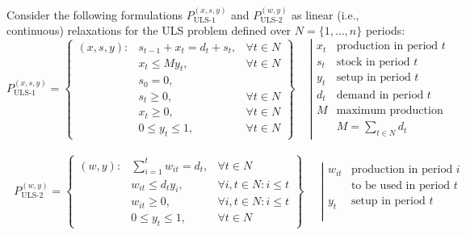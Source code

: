 Consider the following formulations $P_{\text{ULS-1}}^{(x,s,y)}$ and $P_{\text{ULS-2}}^{(w,y)}$ as linear (i.e., continuous) relaxations for the ULS problem defined over $N = \{1,\dots,n\}$ periods:
\renewcommand*{\arraystretch}{1.1}
\[P_{\text{ULS-1}}^{(x,s,y)} = \left\{
  \begin{array}{llr}
  	(x,s,y): & s_{t-1} + x_t = d_t + s_t, & \forall t\in N\\
    	     & x_t  \leq M y_t, 		  & \forall t\in N\\
    	     & s_0 = 0, 			      & 			  \\
    	     & s_t \geq 0, 				  & \forall t\in N\\
    	     & x_t \geq 0, 			      & \forall t\in N\\
    	     & 0 \leq y_{t} \leq 1, 	  & \forall t\in N
  \end{array}\right\}
  \quad~\left|
  \begin{array}{rr}
  	x_t  & \text{production in period } t\\
    s_t  & \text{stock in period }      t\\
    y_t  & \text{setup in period }      t\\[5pt]
    d_t  & \text{demand in period }     t\\
    M    & \text{maximum production}\\
         & M = \sum_{t\in N}d_t
  \end{array}\right.
\]\\[-30pt]


\[~~~P_{\text{ULS-2}}^{(w,y)} = \left\{
  \begin{array}{llr}
    (w,y): & \sum \limits_{i=1}^t w_{it} = d_t, &\forall t\in N\\
    	   & w_{it} \leq d_t y_i,  				&\forall i,t\in N : i\leq t\\
    	   & w_{it} \geq 0,        				&\forall i,t\in N : i\leq t\\
    	   & 0 \leq y_{t} \leq 1,  				&\forall t\in N 
  \end{array}\right\}
  \quad~~\left|
  \begin{array}{rr}
  	w_{it} & \text{production in period } i\\
      	   & \text{to be used in period } t\\[3pt]
       y_t & \text{setup in period } t\\
       	   & \\[7pt] 
  \end{array}\right.
\]

